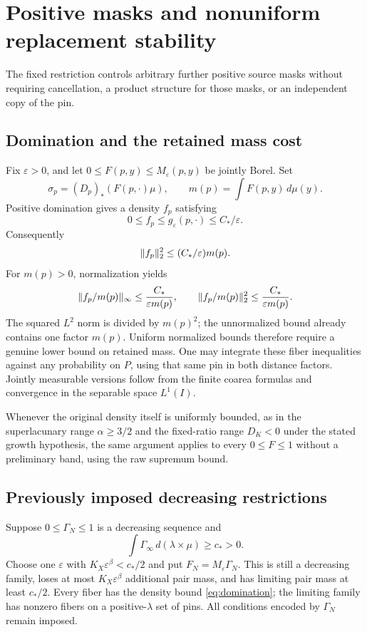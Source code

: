 \section{Positive masks and nonuniform replacement stability}\label{sec:stability}
The fixed restriction controls arbitrary further positive source masks
without requiring cancellation, a product structure for those masks, or
an independent copy of the pin.

\subsection{Domination and the retained mass cost}
Fix $\varepsilon>0$, and let $0\leq F(p,y)\leq M_\varepsilon(p,y)$
be jointly Borel. Set
\[
 \sigma_p=(D_p)_*(F(p,\cdot)\mu),\qquad
 m(p)=\int F(p,y)\,d\mu(y).
\]
Positive domination gives a density $f_p$ satisfying
\begin{equation}\label{eq:domination}
 0\leq f_p\leq g_\varepsilon(p,\cdot)\leq C_*/\varepsilon.
\end{equation}
Consequently
\begin{equation}\label{eq:mask-L2}
 \lVert f_p\rVert_2^2\leq(C_*/\varepsilon)m(p).
\end{equation}
For $m(p)>0$, normalization yields
\begin{equation}\label{eq:normalized}
 \lVert f_p/m(p)\rVert_\infty\leq\frac{C_*}{\varepsilon m(p)},
 \qquad
 \lVert f_p/m(p)\rVert_2^2\leq\frac{C_*}{\varepsilon m(p)}.
\end{equation}
The squared $L^2$ norm is divided by $m(p)^2$; the unnormalized bound
already contains one factor $m(p)$. Uniform normalized bounds therefore
require a genuine lower bound on retained mass. One may integrate these
fiber inequalities against any probability on $P$, using that same pin
in both distance factors. Jointly measurable versions follow from the
finite coarea formulas and convergence in the separable space $L^1(I)$.

Whenever the original density itself is uniformly bounded, as in the
superlacunary range $\alpha\geq3/2$ and the fixed-ratio range $D_K<0$
under the stated growth hypothesis, the same argument applies to every
$0\leq F\leq1$ without a preliminary band, using the raw supremum bound.

\subsection{Previously imposed decreasing restrictions}
Suppose $0\leq\Gamma_N\leq1$ is a decreasing sequence and
\[
 \int\Gamma_\infty\,d(\lambda\times\mu)\geq c_*>0.
\]
Choose one $\varepsilon$ with $K_X\varepsilon^\beta<c_*/2$ and put
$F_N=M_\varepsilon\Gamma_N$. This is still a decreasing family,
loses at most $K_X\varepsilon^\beta$ additional pair mass, and has
limiting pair mass at least $c_*/2$. Every fiber has the density bound
\eqref{eq:domination}; the limiting family has nonzero fibers on a
positive-$\lambda$ set of pins. All conditions encoded by $\Gamma_N$
remain imposed.

